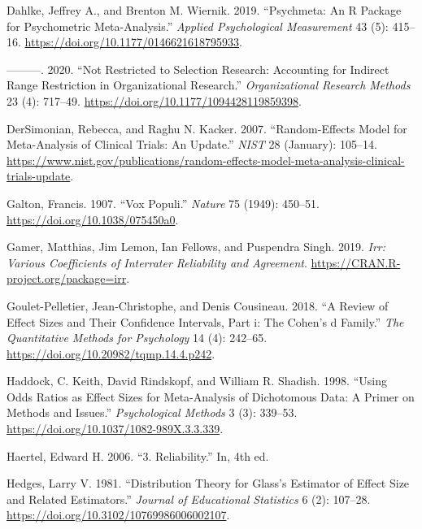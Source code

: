 \documentclass[
  letterpaper,
  DIV=11,
  numbers=noendperiod]{scrreprt}
\newlength{\cslhangindent}
\newlength{\cslentryspacingunit} %
\newenvironment{CSLReferences}[2] %
 {%
  \setlength{\parindent}{0pt}
  \ifodd #1
  \let\oldpar\par
  \def\par{\hangindent=\cslhangindent\oldpar}
  \fi
  \setlength{\parskip}{#2\cslentryspacingunit}
 }%
 {}
\begin{document}
\begin{CSLReferences}{1}{0}
\leavevmode{}%
Dahlke, Jeffrey A., and Brenton M. Wiernik. 2019. {``Psychmeta: An R
Package for Psychometric Meta-Analysis.''} \emph{Applied Psychological
Measurement} 43 (5): 415--16.
\url{https://doi.org/10.1177/0146621618795933}.

\leavevmode{}%
---------. 2020. {``Not Restricted to Selection Research: Accounting for
Indirect Range Restriction in Organizational Research.''}
\emph{Organizational Research Methods} 23 (4): 717--49.
\url{https://doi.org/10.1177/1094428119859398}.

\leavevmode{}%
DerSimonian, Rebecca, and Raghu N. Kacker. 2007. {``Random-Effects Model
for Meta-Analysis of Clinical Trials: An Update.''} \emph{NIST} 28
(January): 105--14.
\url{https://www.nist.gov/publications/random-effects-model-meta-analysis-clinical-trials-update}.

\leavevmode{}%
Galton, Francis. 1907. {``Vox Populi.''} \emph{Nature} 75 (1949):
450--51. \url{https://doi.org/10.1038/075450a0}.

\leavevmode{}%
Gamer, Matthias, Jim Lemon, Ian Fellows, and Puspendra Singh. 2019.
\emph{Irr: Various Coefficients of Interrater Reliability and
Agreement}. \url{https://CRAN.R-project.org/package=irr}.

\leavevmode{}%
Goulet-Pelletier, Jean-Christophe, and Denis Cousineau. 2018. {``A
Review of Effect Sizes and Their Confidence Intervals, Part i: The
Cohen{'}s d Family.''} \emph{The Quantitative Methods for Psychology} 14
(4): 242--65. \url{https://doi.org/10.20982/tqmp.14.4.p242}.

\leavevmode{}%
Haddock, C. Keith, David Rindskopf, and William R. Shadish. 1998.
{``Using Odds Ratios as Effect Sizes for Meta-Analysis of Dichotomous
Data: A Primer on Methods and Issues.''} \emph{Psychological Methods} 3
(3): 339--53. \url{https://doi.org/10.1037/1082-989X.3.3.339}.

\leavevmode{}%
Haertel, Edward H. 2006. {``3. Reliability.''} In, 4th ed.

\leavevmode{}%
Hedges, Larry V. 1981. {``Distribution Theory for Glass's Estimator of
Effect Size and Related Estimators.''} \emph{Journal of Educational
Statistics} 6 (2): 107--28.
\url{https://doi.org/10.3102/10769986006002107}.


\end{CSLReferences}
\end{document}

